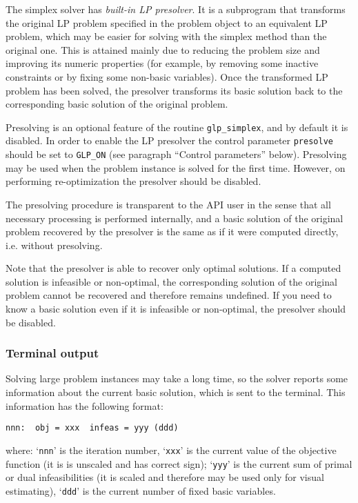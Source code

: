 The simplex solver has {\it built-in LP presolver}. It is a subprogram
that transforms the original LP problem specified in the problem object
to an equivalent LP problem, which may be easier for solving with the
simplex method than the original one. This is attained mainly due to
reducing the problem size and improving its numeric properties (for
example, by removing some inactive constraints or by fixing some
non-basic variables). Once the transformed LP problem has been solved,
the presolver transforms its basic solution back to the corresponding
basic solution of the original problem.

Presolving is an optional feature of the routine \verb|glp_simplex|,
and by default it is disabled. In order to enable the LP presolver the
control parameter \verb|presolve| should be set to \verb|GLP_ON| (see
paragraph ``Control parameters'' below). Presolving may be used when
the problem instance is solved for the first time. However, on
performing re-optimization the presolver should be disabled.

The presolving procedure is transparent to the API user in the sense
that all necessary processing is performed internally, and a basic
solution of the original problem recovered by the presolver is the same
as if it were computed directly, i.e. without presolving.

Note that the presolver is able to recover only optimal solutions. If
a computed solution is infeasible or non-optimal, the corresponding
solution of the original problem cannot be recovered and therefore
remains undefined. If you need to know a basic solution even if it is
infeasible or non-optimal, the presolver should be disabled.

\subsubsection*{Terminal output}

Solving large problem instances may take a long time, so the solver
reports some information about the current basic solution, which is sent
to the terminal. This information has the following format:

\begin{verbatim}
nnn:  obj = xxx  infeas = yyy (ddd)
\end{verbatim}

\noindent
where: `\verb|nnn|' is the iteration number, `\verb|xxx|' is the
current value of the objective function (it is is unscaled and has
correct sign); `\verb|yyy|' is the current sum of primal or dual
infeasibilities (it is scaled and therefore may be used only for visual
estimating), `\verb|ddd|' is the current number of fixed basic
variables.

